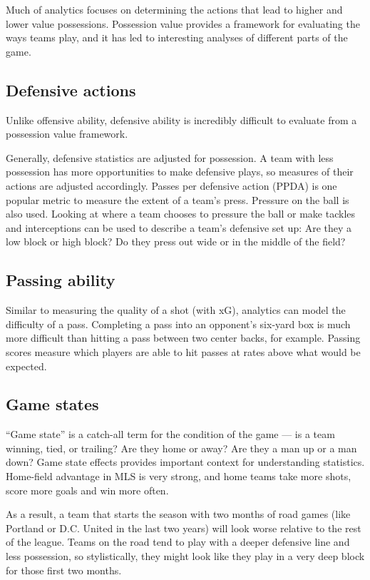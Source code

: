 Much of analytics focuses on determining the actions that lead to higher 
and lower value possessions. Possession value provides a framework for evaluating the ways teams play, 
and it has led to interesting analyses of different parts of the game.

\subsection{Defensive actions}
Unlike offensive ability, defensive ability is incredibly difficult to 
evaluate from a possession value framework.

Generally, defensive statistics are adjusted for possession. 
A team with less possession has more opportunities to make defensive plays, 
so measures of their actions are adjusted accordingly. Passes per defensive 
action (PPDA) is one popular metric to measure the extent of a team’s press. 
Pressure on the ball is also used. Looking at where a team chooses to 
pressure the ball or make tackles and interceptions can be used to describe 
a team’s defensive set up: Are they a low block or high block? Do they 
press out wide or in the middle of the field?

\subsection{Passing ability}
Similar to measuring the quality of a shot (with xG), analytics can model 
the difficulty of a pass. Completing a pass into an opponent’s six-yard box 
is much more difficult than hitting a pass between two center backs, 
for example. Passing scores measure which players are able to hit passes 
at rates above what would be expected.

\subsection{Game states}
“Game state” is a catch-all term for the condition of the game — is a team 
winning, tied, or trailing? Are they home or away? Are they a man up or a 
man down? Game state effects provides important context for understanding 
statistics. Home-field advantage in MLS is very strong, and home teams 
take more shots, score more goals and win more often.

As a result, a team that starts the season with two months of road 
games (like Portland or D.C. United in the last two years) will look worse 
relative to the rest of the league. Teams on the road tend to play with a 
deeper defensive line and less possession, so stylistically, they might 
look like they play in a very deep block for those first two months.

